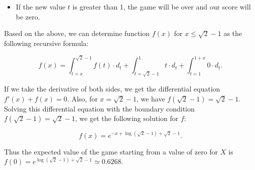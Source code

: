 \begin{solution}
\begin{itemize}
\item If the new value $t$ is greater than 1, the game will be over and our score will be zero.
\end{itemize}

Based on the above, we can determine function $f(x)$ for  $x \leq \sqrt{2}-1$ as the following recursive formula:

$$f(x) = \int_{t=x}^{\sqrt{2}-1} f(t)\cdot d_t + \int_{t=\sqrt{2}-1}^1 t\cdot d_t + \int_{t=1}^{1+x} 0\cdot d_t.$$

If we take the derivative of both sides, we get the differential equation $f'(x)+f(x)=0$. Also, for $x=\sqrt{2}-1$, we have $f(\sqrt{2}-1)=\sqrt{2}-1$. Solving this differential equation with the boundary condition $f(\sqrt{2}-1) = \sqrt{2}-1$, we get the following solution for $f$:

$$f(x) = e^{-x+\log(\sqrt{2}-1)+\sqrt{2}-1}.$$

Thus the expected value of the game starting from a value of zero for $X$ is $f(0) = e^{\log(\sqrt{2}-1)+\sqrt{2}-1}  \simeq 0.6268$.


\end{solution}


